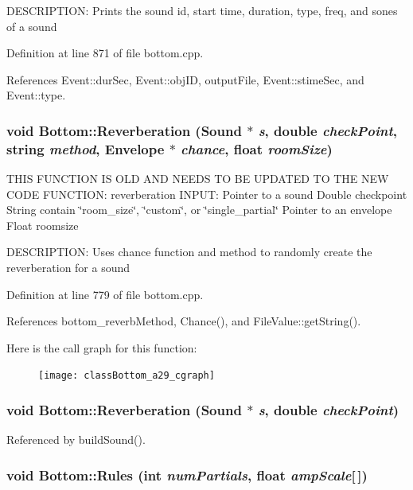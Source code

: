 DESCRIPTION: Prints the sound id, start time, duration, type, freq, and sones of a sound 

Definition at line 871 of file bottom.cpp.

References Event::dur\-Sec, Event::obj\-ID, output\-File, Event::stime\-Sec, and Event::type.
\subsubsection{\setlength{\rightskip}{0pt plus 5cm}void Bottom::Reverberation (Sound $\ast$ {\em s}, double {\em check\-Point}, string {\em method}, Envelope $\ast$ {\em chance}, float {\em room\-Size})}\label{classBottom_a29}


THIS FUNCTION IS OLD AND NEEDS TO BE UPDATED TO THE NEW CODE FUNCTION: reverberation INPUT: Pointer to a sound Double checkpoint String contain \char`\"{}room\_\-size\char`\"{}, \char`\"{}custom\char`\"{}, or \char`\"{}single\_\-partial\char`\"{} Pointer to an envelope Float roomsize

DESCRIPTION: Uses chance function and method to randomly create the reverberation for a sound 

Definition at line 779 of file bottom.cpp.

References bottom\_\-reverb\-Method, Chance(), and File\-Value::get\-String().

Here is the call graph for this function:\begin{figure}[H]
\begin{center}
\leavevmode
\texttt{[image: classBottom\_a29\_cgraph]}
\end{center}
\end{figure}
\subsubsection{\setlength{\rightskip}{0pt plus 5cm}void Bottom::Reverberation (Sound $\ast$ {\em s}, double {\em check\-Point})}\label{classBottom_a28}




Referenced by build\-Sound().
\subsubsection{\setlength{\rightskip}{0pt plus 5cm}void Bottom::Rules (int {\em num\-Partials}, float {\em amp\-Scale}[$\,$])}\label{classBottom_a21}


